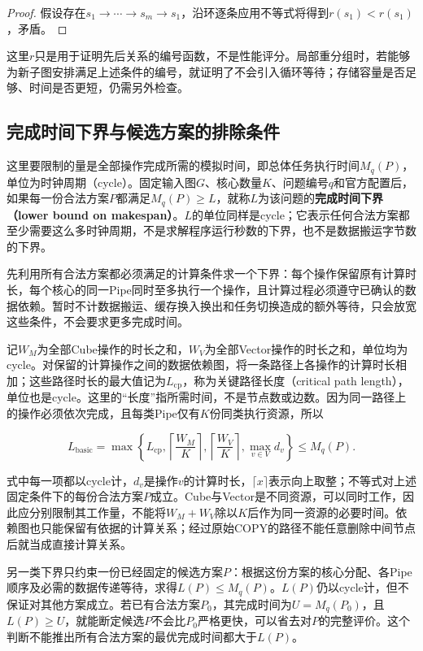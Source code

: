 \documentclass[anonymous,notoc]{gmcm2026}
\begin{document}
\begin{proof} 假设存在\(s_1\to\cdots\to s_m\to s_1\)，沿环逐条应用不等式将得到\(r(s_1)<r(s_1)\)，矛盾。\end{proof}

这里\(r\)只是用于证明先后关系的编号函数，不是性能评分。局部重分组时，若能够为新子图安排满足上述条件的编号，就证明了不会引入循环等待；存储容量是否足够、时间是否更短，仍需另外检查。

\subsection{完成时间下界与候选方案的排除条件}

这里要限制的量是全部操作完成所需的模拟时间，即总体任务执行时间\(M_q(P)\)，单位为时钟周期（cycle）。固定输入图\(G\)、核心数量\(K\)、问题编号\(q\)和官方配置后，如果每一份合法方案\(P\)都满足\(M_q(P)\ge L\)，就称\(L\)为该问题的\textbf{完成时间下界（lower bound on makespan）}。\(L\)的单位同样是cycle；它表示任何合法方案都至少需要这么多时钟周期，不是求解程序运行秒数的下界，也不是数据搬运字节数的下界。

先利用所有合法方案都必须满足的计算条件求一个下界：每个操作保留原有计算时长，每个核心的同一Pipe同时至多执行一个操作，且计算过程必须遵守已确认的数据依赖。暂时不计数据搬运、缓存换入换出和任务切换造成的额外等待，只会放宽这些条件，不会要求更多完成时间。

记\(W_M\)为全部Cube操作的时长之和，\(W_V\)为全部Vector操作的时长之和，单位均为cycle。对保留的计算操作之间的数据依赖图，将一条路径上各操作的计算时长相加；这些路径时长的最大值记为\(L_{\mathrm{cp}}\)，称为关键路径长度（critical path length），单位也是cycle。这里的``长度''指所需时间，不是节点数或边数。因为同一路径上的操作必须依次完成，且每类Pipe仅有\(K\)份同类执行资源，所以

\[L_{\mathrm{basic}}=\max\left\{L_{\mathrm{cp}},\left\lceil\frac{W_M}{K}\right\rceil,\left\lceil\frac{W_V}{K}\right\rceil,\max_{v\in V}d_v\right\}\le M_q(P).\]

式中每一项都以cycle计，\(d_v\)是操作\(v\)的计算时长，\(\lceil x\rceil\)表示向上取整；不等式对上述固定条件下的每份合法方案\(P\)成立。Cube与Vector是不同资源，可以同时工作，因此应分别限制其工作量，不能将\(W_M+W_V\)除以\(K\)后作为同一资源的必要时间。依赖图也只能保留有依据的计算关系；经过原始COPY的路径不能任意删除中间节点后就当成直接计算关系。

另一类下界只约束一份已经固定的候选方案\(P\)：根据这份方案的核心分配、各Pipe顺序及必需的数据传递等待，求得\(L(P)\le M_q(P)\)。\(L(P)\)仍以cycle计，但不保证对其他方案成立。若已有合法方案\(P_0\)，其完成时间为\(U=M_q(P_0)\)，且\(L(P)\ge U\)，就能断定候选\(P\)不会比\(P_0\)严格更快，可以省去对\(P\)的完整评价。这个判断不能推出所有合法方案的最优完成时间都大于\(L(P)\)。
\end{document}

